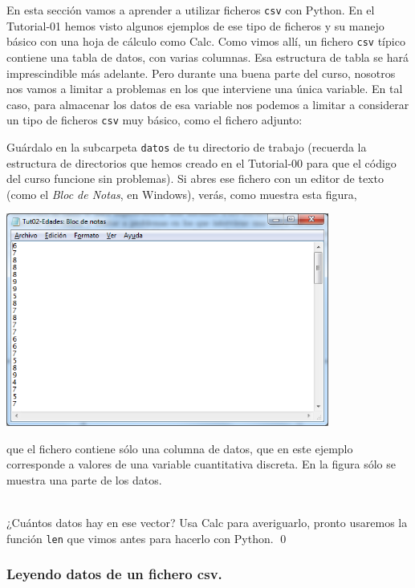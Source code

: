 \documentclass[10pt,a4paper]{article}\usepackage[]{graphicx}\usepackage[]{color}
\newcounter {cont01}
\begin{document}
En esta sección vamos a aprender a utilizar ficheros {\tt csv} con Python.  En el Tutorial-01 hemos visto algunos ejemplos de ese tipo de ficheros y su manejo básico con una hoja de cálculo como Calc. Como vimos allí, un fichero {\tt csv} típico contiene una tabla de datos, con varias columnas. Esa estructura de tabla se hará imprescindible más adelante. Pero durante una buena parte del curso, nosotros nos vamos a limitar a problemas en los que interviene una única variable. En tal caso, para almacenar los datos de esa variable nos podemos a limitar a considerar un tipo de ficheros {\tt csv} muy básico, como el fichero adjunto:
\begin{center}
\end{center}
Guárdalo en la subcarpeta {\tt datos} de tu directorio de trabajo (recuerda la estructura de directorios que hemos creado en el Tutorial-00 para que el código del curso funcione sin problemas). Si abres ese fichero con un editor de texto (como el {\em Bloc de Notas}, en Windows), verás, como muestra esta figura,
\begin{center}
\includegraphics[height=7cm]{../fig/Tut02-06.png}
\end{center}
que el fichero contiene  sólo una columna de datos, que en este ejemplo corresponde a valores de una variable cuantitativa discreta. En la figura sólo se muestra una parte de los datos.
\begin{ejercicio}
\label{tut02:ejercicio19}
\quad\\
¿Cuántos datos hay en ese vector? Usa Calc para averiguarlo, pronto usaremos la función {\tt len} que vimos antes para hacerlo con Python.
\qed
\end{ejercicio}

\subsubsection*{Leyendo datos de un fichero csv.}
\label{tut02:subsubsec:leyendoDatosFicheroCsv}
\end{document}
